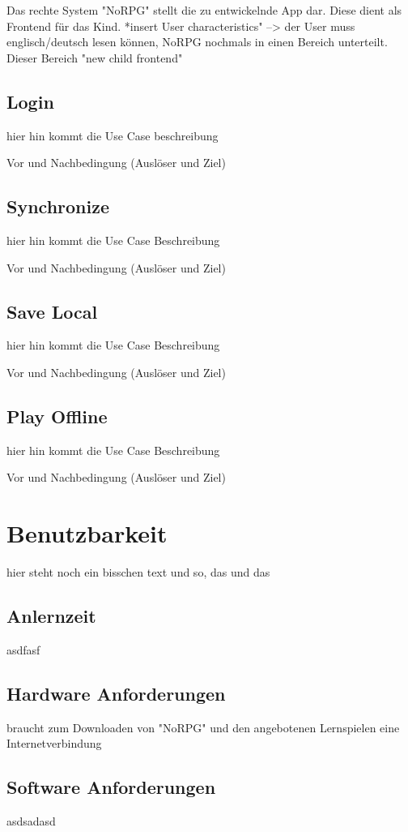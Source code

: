 	Das rechte System "NoRPG" stellt die zu entwickelnde App dar. Diese dient als Frontend für das Kind. *insert User characteristics" --> der User muss englisch/deutsch lesen können, 
	NoRPG nochmals in einen Bereich unterteilt. Dieser Bereich "new child frontend" 
	
	
	\subsection*{Login}
		hier hin kommt die Use Case beschreibung
		
		Vor und Nachbedingung (Auslöser und Ziel)
		
	\subsection*{Synchronize}
		hier hin kommt die Use Case Beschreibung
		
		Vor und Nachbedingung (Auslöser und Ziel)		
			
	\subsection*{Save Local}
		hier hin kommt die Use Case Beschreibung
		
		Vor und Nachbedingung (Auslöser und Ziel)	
	
	\subsection*{Play Offline}
		hier hin kommt die Use Case Beschreibung
		
		Vor und Nachbedingung (Auslöser und Ziel)	
	
\section{Benutzbarkeit}
hier steht noch ein bisschen text und so, das und das
	
	\subsection{Anlernzeit}
		asdfasf
	
	\subsection{Hardware Anforderungen}
		braucht zum Downloaden von "NoRPG" und den angebotenen Lernspielen eine Internetverbindung	
	
	\subsection{Software Anforderungen}
		asdsadasd
	
